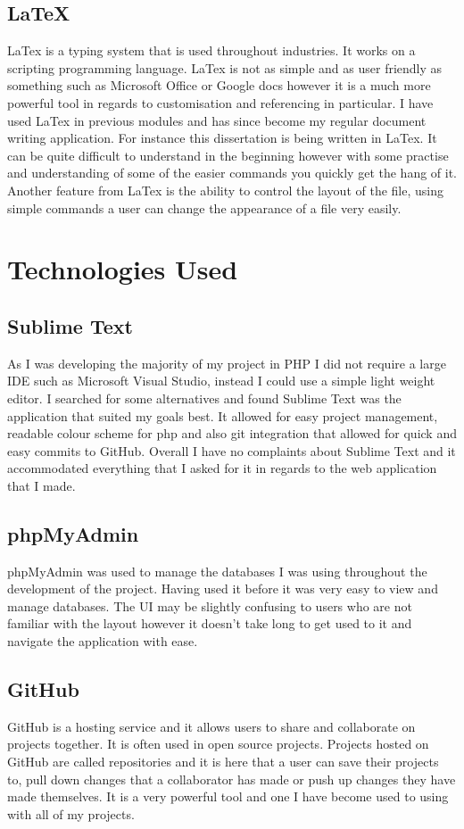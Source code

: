 \subsection{LaTeX}
LaTex is a typing system that is used throughout industries. It works on a scripting programming language. LaTex is not as simple and as user friendly as something such as Microsoft Office or Google docs however it is a much more powerful tool in regards to customisation and referencing in particular. I have used LaTex in previous modules and has since become my regular document writing application. For instance this dissertation is being written in LaTex. It can be quite difficult to understand in the beginning however with some practise and understanding of some of the easier commands you quickly get the hang of it. Another feature from LaTex is the ability to control the layout of the file, using simple commands a user can change the appearance of a file very easily.

\section{Technologies Used}
\subsection{Sublime Text}
As I was developing the majority of my project in PHP I did not require a large IDE such as Microsoft Visual Studio, instead I could use a simple light weight editor. I searched for some alternatives and found Sublime Text was the application that suited my goals best. It allowed for easy project management, readable colour scheme for php and also git integration that allowed for quick and easy commits to GitHub. Overall I have no complaints about Sublime Text and it accommodated everything that I asked for it in regards to the web application that I made. 

\subsection{phpMyAdmin}
phpMyAdmin was used to manage the databases I was using throughout the development of the project. Having used it before it was very easy to view and manage databases. The UI may be slightly confusing to users who are not familiar with the layout however it doesn't take long to get used to it and navigate the application with ease.

\subsection{GitHub}
GitHub is a hosting service and it allows users to  share and collaborate on projects together. It is often used in open source projects. Projects hosted on GitHub are called repositories and it is here that a user can save their projects to, pull down changes that a collaborator has made or push up changes they have made themselves. It is a very powerful tool and one I have become used to using with all of my projects.


